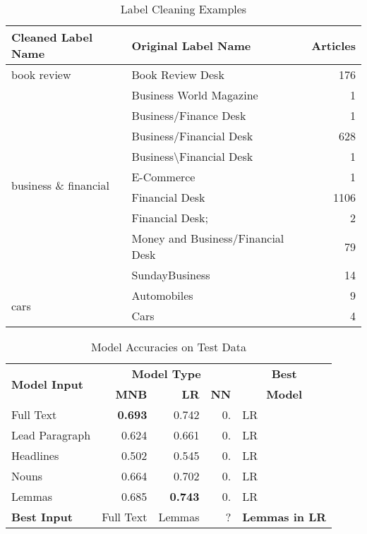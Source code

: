 \documentclass[11pt,a4paper]{article}
\begin{document}
\begin{table}
\centering
\small
\begin{tabular}{llr}
	\hline
	\textbf{Cleaned Label Name} & \textbf{Original Label Name} & \textbf{Articles} \\
	\hline
	book review & Book Review Desk & 176 \\
	\hline
	\multirow{9}{*}{business \& financial} & Business World Magazine & 1 \\
	& Business/Finance Desk & 1 \\
	& Business/Financial Desk & 628 \\
	& Business\textbackslash Financial Desk & 1 \\
	& E-Commerce & 1 \\
	& Financial Desk & 1106 \\
	& Financial Desk; & 2 \\
	& Money and Business/Financial Desk & 79 \\
	& SundayBusiness & 14 \\
	\hline
	\multirow{2}{*}{cars} & Automobiles & 9 \\
	& Cars & 4 \\
	\hline
\end{tabular}
\caption{Label Cleaning Examples}
\label{tbl:label-clean}
\end{table}

\begin{table}
\centering
\small
\begin{tabular}{|l|rrr|p{1.2cm}|}
	\hline
	\multirow{2}{*}{\textbf{Model Input}} & \multicolumn{3}{c|}{\textbf{Model Type}} & \multicolumn{1}{c|}{\textbf{Best}} \\
	\cline{2-4}
	& \textbf{MNB} & \textbf{LR} & \textbf{NN} & \multicolumn{1}{c|}{\textbf{Model}} \\
	\hline
	Full Text			& \textbf{0.693}	& 0.742		& 0.		& LR \\
	Lead Paragraph	& 0.624		& 0.661		& 0.		& LR \\
	Headlines			& 0.502		& 0.545		& 0.		& LR \\
	Nouns			& 0.664		& 0.702		& 0.		& LR \\
	Lemmas			& 0.685		& \textbf{0.743}	& 0.		& LR \\
	\hline
	\textbf{Best Input} & Full Text & Lemmas & ? & \textbf{Lemmas in LR} \\
	\hline
\end{tabular}
\caption{Model Accuracies on Test Data}
\label{tbl:acc}
\end{table}
\end{document}
